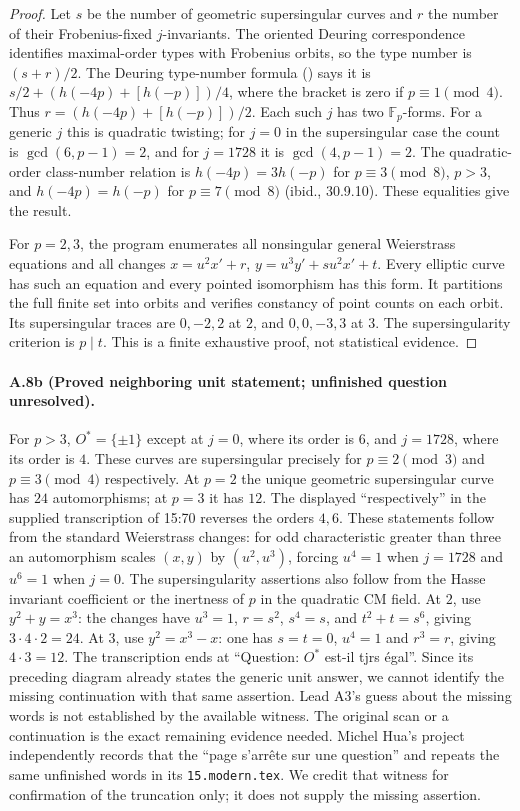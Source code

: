 \begin{proof}
Let $s$ be the number of geometric supersingular curves and $r$ the
number of their Frobenius-fixed $j$-invariants. The oriented Deuring
correspondence identifies maximal-order types with Frobenius orbits,
so the type number is $(s+r)/2$. The Deuring type-number formula
(\citealp[Proposition 30.9.2]{Voight2021}) says it is
$s/2+(h(-4p)+[h(-p)])/4$, where the bracket is zero if
$p\equiv1\pmod4$. Thus $r=(h(-4p)+[h(-p)])/2$.
Each such $j$ has two $\mathbb F_p$-forms. For a generic $j$ this is
quadratic twisting; for $j=0$ in the supersingular case the count is
$\gcd(6,p-1)=2$, and for $j=1728$ it is $\gcd(4,p-1)=2$.
The quadratic-order class-number relation is
$h(-4p)=3h(-p)$ for $p\equiv3\pmod8$, $p>3$, and
$h(-4p)=h(-p)$ for $p\equiv7\pmod8$ (ibid., 30.9.10).
These equalities give the result.

For $p=2,3$, the program enumerates all nonsingular general
Weierstrass equations and all changes
$x=u^2x'+r$, $y=u^3y'+su^2x'+t$. Every elliptic curve has such an
equation and every pointed isomorphism has this form. It partitions
the full finite set into orbits and verifies constancy of point counts
on each orbit. Its supersingular traces are $0,-2,2$ at $2$, and
$0,0,-3,3$ at $3$. The supersingularity criterion is $p\mid t$.
This is a finite exhaustive proof, not statistical evidence.
\end{proof}

\paragraph{A.8b (Proved neighboring unit statement; unfinished question unresolved).}
For $p>3$, $O^*=\{\pm1\}$ except at $j=0$, where its order is $6$,
and $j=1728$, where its order is $4$. These curves are supersingular
precisely for $p\equiv2\pmod3$ and $p\equiv3\pmod4$ respectively.
At $p=2$ the unique geometric supersingular curve has $24$
automorphisms; at $p=3$ it has $12$. The displayed ``respectively''
in the supplied transcription of 15:70 reverses the orders $4,6$.
These statements follow from the standard Weierstrass changes: for
odd characteristic greater than three an automorphism scales
$(x,y)$ by $(u^2,u^3)$, forcing $u^4=1$ when $j=1728$ and $u^6=1$
when $j=0$. The supersingularity assertions also follow from the
Hasse invariant coefficient or the inertness of $p$ in the quadratic
CM field. At $2$, use $y^2+y=x^3$: the changes have $u^3=1$,
$r=s^2$, $s^4=s$, and $t^2+t=s^6$, giving $3\cdot4\cdot2=24$.
At $3$, use $y^2=x^3-x$: one has $s=t=0$, $u^4=1$ and $r^3=r$,
giving $4\cdot3=12$.
The transcription ends at ``Question: $O^*$ est-il tjrs égal''.
Since its preceding diagram already states the generic unit answer,
we cannot identify the missing continuation with that same assertion.
Lead A3's guess about the missing words is not established by the
available witness. The original scan or a continuation is the exact
remaining evidence needed.
Michel Hua's project independently records that the ``page s'arrête
sur une question'' and repeats the same unfinished words in its
\texttt{15.modern.tex}. We credit that witness for confirmation of
the truncation only; it does not supply the missing assertion.

